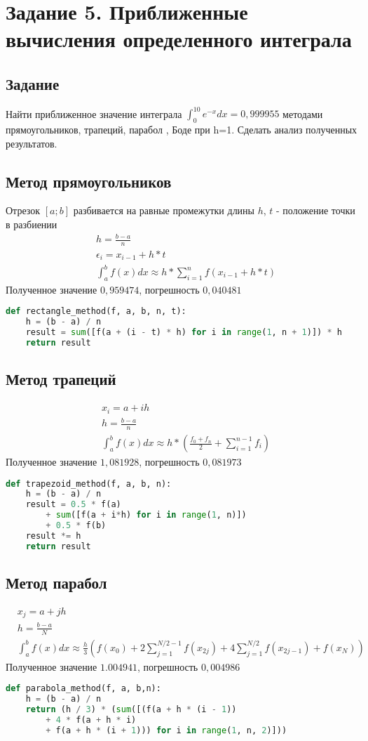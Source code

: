 \section{Задание 5. Приближенные вычисления определенного интеграла}
\subsection{Задание}
Найти приближенное значение интеграла $ \int_0^{10}{e^{-x}	dx} = 0,999955 $ методами прямоугольников, трапеций, парабол , Боде при h=1. Сделать анализ полученных результатов.
\subsection{Метод прямоугольников}
Отрезок $ [a;b] $ разбивается на равные промежутки длины $ h $, $ t $ - положение точки в разбиении 
\begin{align*}
	&h = \frac{b - a}{n} \\
	&\epsilon_i = x_{i - 1} + h * t \\
	&\int_{a}^{b} f(x)dx \approx h * \sum_{i = 1}^{n} f\left(x_{i-1} + h*t \right)
\end{align*}
Полученное значение $ 0,959474 $, погрешность $ 0,040481 $
\begin{lstlisting}[language=Python]
def rectangle_method(f, a, b, n, t):
	h = (b - a) / n
	result = sum([f(a + (i - t) * h) for i in range(1, n + 1)]) * h
	return result
\end{lstlisting}
\subsection{Метод трапеций}
\begin{align*}
	&x_i = a + ih \\
	&h = \frac{b - a}{n} \\
	&\int_a^b f(x) dx \approx h * \left(\frac{f_0 + f_n}{2} + \sum_{i = 1}^{n-1} f_i\right)
\end{align*}
Полученное значение $ 1,081928 $, погрешность $ 0,081973 $
\begin{lstlisting}[language=Python]
def trapezoid_method(f, a, b, n):
	h = (b - a) / n
	result = 0.5 * f(a) 
		+ sum([f(a + i*h) for i in range(1, n)]) 
		+ 0.5 * f(b)
	result *= h
	return result
\end{lstlisting}
\subsection{Метод парабол}
\begin{align*}
	&x_j = a + jh \\
	&h = \frac{b - a}{N} \\
	&\int_a^b f(x) dx \approx \frac{h}{3} \left(f(x_0)  + 2\sum_{j=1}^{N/2-1}f(x_{2j}) + 4\sum_{j=1}^{N/2}f(x_{2j-1}) + f(x_N)\right)
\end{align*}
Полученное значение $ 1.004941 $, погрешность $ 0,004986 $
\begin{lstlisting}[language=Python]
def parabola_method(f, a, b,n):
	h = (b - a) / n
	return (h / 3) * (sum([(f(a + h * (i - 1)) 
		+ 4 * f(a + h * i) 
		+ f(a + h * (i + 1))) for i in range(1, n, 2)]))
\end{lstlisting}
\newpage
